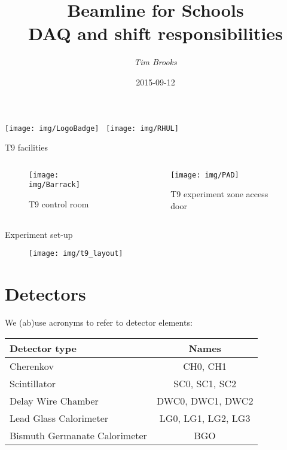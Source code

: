 \documentclass[9pt]{beamer}
\title[Beamline for Schools\hspace{2em}\insertframenumber/
\inserttotalframenumber]{Beamline for Schools\\DAQ and shift responsibilities}
\author{\emph{Tim Brooks}}
\institute{CERN / RHUL}
\date{2015-09-12}
\begin{document}

\begin{frame}
\titlepage{}
\centering
\texttt{[image: img/LogoBadge]}
\,
\texttt{[image: img/RHUL]}
\end{frame}


\begin{frame}{T9 facilities}
\begin{columns}
  \begin{column}{.4\textwidth}
    \vspace*{-0.5cm}
    \begin{figure}\texttt{[image: img/Barrack]}\vspace*{-0.2cm}\caption{T9 control room}\end{figure}\vspace*{-1cm}
  \end{column}
  \begin{column}{.4\textwidth}
    \vspace*{-0.5cm}
    \begin{figure}\texttt{[image: img/PAD]}\vspace*{-0.2cm}\caption{T9 experiment zone access door}\end{figure}\vspace*{-1cm}
  \end{column}
\end{columns}
\end{frame}

\begin{frame}{Experiment set-up}
\begin{figure}\centering
    \texttt{[image: img/t9\_layout]}
\end{figure}
\end{frame}

\section{Detectors}
\begin{frame}
\begin{center}
We {\tiny(ab)}use acronyms to refer to detector elements:

\begin{tabular}{|l|c|}\hline
    Detector type & Names \\\hline
    Cherenkov & CH0, CH1 \\
    Scintillator & SC0, SC1, SC2 \\
    Delay Wire Chamber & DWC0, DWC1, DWC2 \\
    Lead Glass Calorimeter & LG0, LG1, LG2, LG3 \\
    Bismuth Germanate Calorimeter & BGO \\
\hline
\end{tabular}
\end{center}
\end{frame}
\end{document}
